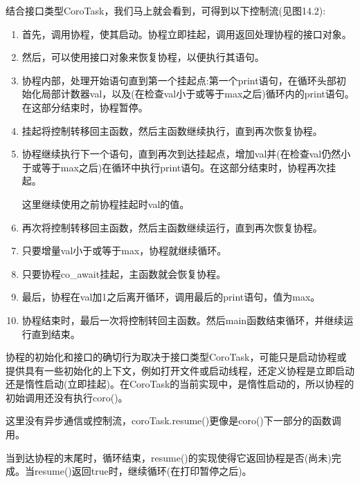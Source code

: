 结合接口类型CoroTask，我们马上就会看到，可得到以下控制流(见图14.2):

\begin{enumerate}[label=\alph*)]
\item
首先，调用协程，使其启动。协程立即挂起，调用返回处理协程的接口对象。

\item
然后，可以使用接口对象来恢复协程，以便执行其语句。

\item
协程内部，处理开始语句直到第一个挂起点:第一个print语句，在循环头部初始化局部计数器val，以及(在检查val小于或等于max之后)循环内的print语句。在这部分结束时，协程暂停。

\item
挂起将控制转移回主函数，然后主函数继续执行，直到再次恢复协程。

\item
协程继续执行下一个语句，直到再次到达挂起点，增加val并(在检查val仍然小于或等于max之后)在循环中执行print语句。在这部分结束时，协程再次挂起。

这里继续使用之前协程挂起时val的值。

\item
再次将控制转移回主函数，然后主函数继续运行，直到再次恢复协程。

\item
只要增量val小于或等于max，协程就继续循环。

\item
只要协程co\_await挂起，主函数就会恢复协程。

\item
最后，协程在val加1之后离开循环，调用最后的print语句，值为max。

\item
协程结束时，最后一次将控制转回主函数。然后main函数结束循环，并继续运行直到结束。
\end{enumerate}

协程的初始化和接口的确切行为取决于接口类型CoroTask，可能只是启动协程或提供具有一些初始化的上下文，例如打开文件或启动线程，还定义协程是立即启动还是惰性启动(立即挂起)。在CoroTask的当前实现中，是惰性启动的，所以协程的初始调用还没有执行coro()。

这里没有异步通信或控制流，coroTask.resume()更像是coro()下一部分的函数调用。

当到达协程的末尾时，循环结束，resume()的实现使得它返回协程是否(尚未)完成。当resume()返回true时，继续循环(在打印暂停之后)。


